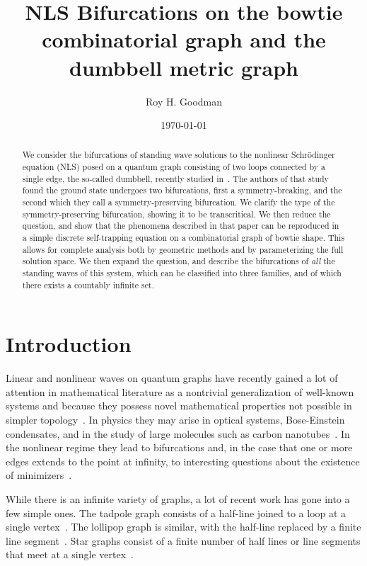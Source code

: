\documentclass{article}
\title{NLS Bifurcations on the bowtie combinatorial graph and the dumbbell metric graph}
\author{Roy H. Goodman}
\date{\today}
\numberwithin{equation}{section}
\numberwithin{figure}{section}
\begin{document}
 
 \maketitle
\begin{abstract}
We consider the bifurcations of standing wave solutions to the nonlinear Schr\"odinger equation (NLS) posed on a quantum graph consisting of two loops connected by a single edge, the so-called dumbbell, recently studied in~\cite{Marzuola:2016bl}. The authors of that study found the ground state undergoes two bifurcations, first a symmetry-breaking, and the second which they call a symmetry-preserving bifurcation. We clarify the type of the symmetry-preserving bifurcation, showing it to be transcritical. We then reduce the question, and show that the phenomena described in that paper can be reproduced in a simple discrete self-trapping equation on a combinatorial graph of bowtie shape. This allows for complete analysis both by geometric methods and by parameterizing the full solution space. We then expand the question, and describe the bifurcations of \emph{all} the standing waves of this system, which can be classified into three families, and of which there exists a countably infinite set.
\end{abstract}



\section{Introduction}
Linear and nonlinear waves on quantum graphs have recently gained a lot of attention in   mathematical literature as a nontrivial generalization of well-known systems and because they possess novel mathematical properties not possible in simpler topology~\cite{Berkolaiko:2013,Berkolaiko:2017}. In physics they may arise in optical systems, Bose-Einstein condensates, and in the study of large molecules such as carbon nanotubes~\cite{Delourme:2017jd,Kuchment:2007,Niikuni:2017fu,Bolte:2014}. In the nonlinear regime they lead to  bifurcations and, in the case that one or more edges extends to the point at infinity, to interesting questions about the existence of minimizers~\cite{Pelinovsky:2016fm,Noja:2017vd,Cacciapuoti:2015fe,Adami:2015di,Adami:2017te,Adami:2016hx,Adami:2014hn,Adami:2016do, Cacciapuoti:2017hr}.

While there is an infinite variety of graphs, a lot of recent work has gone into a few simple ones. The tadpole graph consists of a half-line joined to a loop at a single vertex~\cite{Noja:2015hx}. The lollipop graph is similar, with the half-line replaced by a finite line segment~\cite{Berkolaiko:2017}. Star graphs consist of a finite number of half lines or line segments that meet at a single vertex~\cite{Adami:2012jb}.
\end{document}
